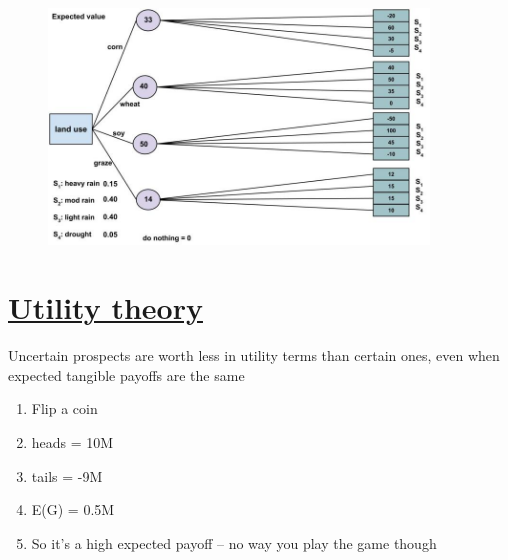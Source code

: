 \documentclass[aspectratio=1610,pdftex,dvipsnames,compress,xcolor={dvipsnames}]{beamer}
\begin{document}
\begin{frame}{}
    \begin{figure}
        \centering
        \includegraphics[width=0.90\textwidth]{land.use.expected.jpg}
    \end{figure}
\end{frame}


\section{\href{https://uidaho.pressbooks.pub/riskassessment/chapter/utility-theory/}{Utility theory}}


\addtocounter{framenumber}{-1}
\begin{frame}{Uncertain prospects are worth less in utility terms than certain ones, even when expected tangible payoffs are the same}
    \begin{enumerate}[series=outerlist,topsep=0pt,itemsep=21pt,leftmargin=*,label=(\arabic*)]
        \item[]Flip a coin    
        \item[]heads = 10M  
        \item[]tails = -9M  
        \item[]E(G) = 0.5M
        \item[]So it's a high expected payoff -- no way you play the game though
    \end{enumerate}
\end{frame}
\end{document}
